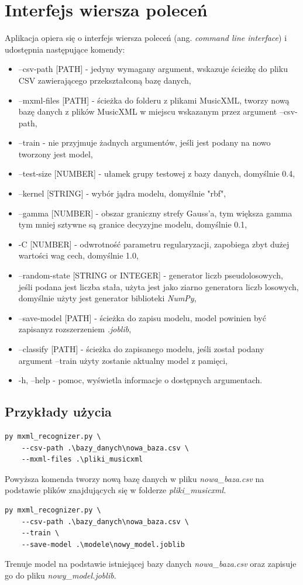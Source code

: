 \documentclass[printmode, eng, openany]{mgr}
\newcommand\tab[1][1cm]{\hspace*{#1}}
\begin{document}
\section{Interfejs wiersza poleceń}
\tab Aplikacja opiera się o interfejs wiersza poleceń (ang. \textit{command line interface}) i udostępnia następujące komendy:
\begin{itemize}
\item --csv-path [PATH] - jedyny wymagany argument, wskazuje ścieżkę do pliku CSV zawierającego przekształconą bazę danych,
\item --mxml-files [PATH] - ścieżka do folderu z plikami MusicXML, tworzy nową bazę danych z plików MusicXML w miejscu wskazanym przez argument --csv-path,
\item --train - nie przyjmuje żadnych argumentów, jeśli jest podany na nowo tworzony jest model,
\item --test-size [NUMBER] - ułamek grupy testowej z bazy danych, domyślnie 0.4,
\item --kernel [STRING] - wybór jądra modelu, domyślnie "rbf",
\item --gamma [NUMBER] - obszar graniczny strefy Gauss'a, tym większa gamma tym mniej sztywne są granice decyzyjne modelu, domyślnie 0.1, 
\item -C [NUMBER] - odwrotność parametru regularyzacji, zapobiega zbyt dużej wartości wag cech, domyślnie 1.0, 
\item --random-state [STRING or INTEGER] - generator liczb pseudolosowych, jeśli podana jest liczba stała, użyta jest jako ziarno generatora liczb losowych, domyślnie użyty jest generator biblioteki \textit{NumPy},
\item --save-model [PATH] - ścieżka do zapisu modelu, model powinien być zapisany\linebreak z rozszerzeniem \textit{.joblib},
\item --classify [PATH] - ścieżka do zapisanego modelu, jeśli został podany argument --train użyty zostanie aktualny model z pamięci,
\item -h, --help - pomoc, wyświetla informacje o dostępnych argumentach.
\end{itemize}
\subsection{Przykłady użycia}
\begin{lstlisting}
py mxml_recognizer.py \
	--csv-path .\bazy_danych\nowa_baza.csv \
	--mxml-files .\pliki_musicxml 
\end{lstlisting}
Powyższa komenda tworzy nową bazę danych w pliku \textit{nowa\_baza.csv} na podstawie plików znajdujących się w folderze \textit{pliki\_musicxml}.
\begin{lstlisting}
py mxml_recognizer.py \
	--csv-path .\bazy_danych\nowa_baza.csv \
	--train \
	--save-model .\modele\nowy_model.joblib
\end{lstlisting}
Trenuje model na podstawie istniejącej bazy danych 
\textit{nowa\_baza.csv} oraz zapisuje go do pliku \textit{nowy\_model.joblib}.
\end{document}
